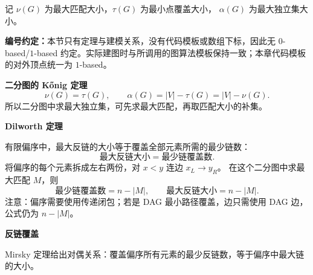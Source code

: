 记 $\nu(G)$ 为最大匹配大小，$\tau(G)$ 为最小点覆盖大小，
$\alpha(G)$ 为最大独立集大小。

\textbf{编号约定：}本节只有定理与建模关系，没有代码模板或数组下标，因此无 $0$-based/$1$-based 约定。实际建图时与所调用的图算法模板保持一致；本章代码模板的对外顶点统一为 $1$-based。

\textbf{二分图的 K\H{o}nig 定理}
\[
  \nu(G)=\tau(G),
  \qquad
  \alpha(G)=|V|-\tau(G)=|V|-\nu(G).
\]
所以二分图中求最大独立集，可先求最大匹配，再取匹配大小的补集。

\textbf{Dilworth 定理}

有限偏序中，最大反链的大小等于覆盖全部元素所需的最少链数：
\[
  \text{最大反链大小}
  =\text{最少链覆盖数}.
\]
将偏序的每个元素拆成左右两份，对 $x<y$ 连边 $x_L\to y_R$。
在这个二分图中求最大匹配 $M$，则
\[
  \text{最少链覆盖数}
  =n-|M|,
  \qquad
  \text{最大反链大小}=n-|M|.
\]
注意：偏序需要使用传递闭包；若是 DAG 最小路径覆盖，边只需使用 DAG 边，公式仍为 $n-|M|$。

\textbf{反链覆盖}

Mirsky 定理给出对偶关系：覆盖偏序所有元素的最少反链数，等于偏序中最大链的大小。

